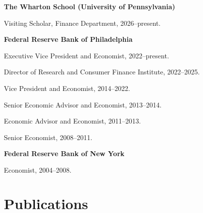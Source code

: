 \documentclass[letterpaper, 12pt]{article}
\newenvironment{itemize2}{
  \begin{list}{}{
    \setlength{\leftmargin}{1.5em}
  }
}{
  \end{list}
}
\renewenvironment{itemize}{
  \begin{list}{}{
    \setlength{\leftmargin}{2em}
  }
}{
  \end{list}
}
\begin{document}
\begin{itemize2}
\item \textbf{The Wharton School (University of Pennsylvania)}
\begin{itemize2}
  \item Visiting Scholar, Finance Department, 2026--present.
\end{itemize2}

\smallskip

\item \textbf{Federal Reserve Bank of Philadelphia}
\begin{itemize2}
  \item Executive Vice President and Economist, 2022--present.
  \begin{itemize}
    \item Director of Research and Consumer Finance Institute, 2022--2025.
  \end{itemize}
  \item Vice President and Economist, 2014--2022.
  \item Senior Economic Advisor and Economist, 2013--2014.
  \item Economic Advisor and Economist, 2011--2013.
  \item Senior Economist, 2008--2011.
\end{itemize2}

\smallskip

\item \textbf{Federal Reserve Bank of New York}
\begin{itemize2}
  \item Economist, 2004--2008.
\end{itemize2}
\end{itemize2}

\section*{Publications}
\end{document}
